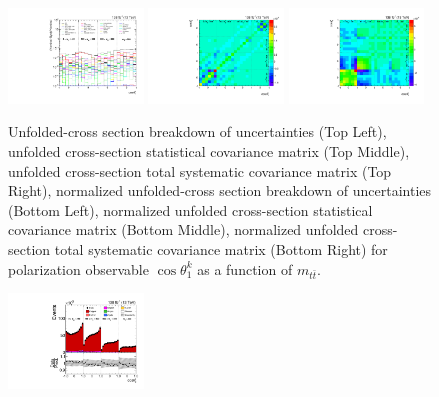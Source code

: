 \begin{refsection}
\begin{figure}[htb]
\begin{center}
 \includegraphics[width=0.32\textwidth]{fig_fullRun2UL/unfolding/combined/deltaSystCombinedlogNorm_rebinnedB_b1k_mttbar.pdf}
 \includegraphics[width=0.32\textwidth]{fig_fullRun2UL/unfolding/combined/StatCovMatrixNorm_rebinnedB_b1k_mttbar.pdf}
 \includegraphics[width=0.32\textwidth]{fig_fullRun2UL/unfolding/combined/TotalSystCovMatrixNorm_rebinnedB_b1k_mttbar.pdf} \\
\caption{Unfolded-cross section breakdown of uncertainties (Top Left), unfolded cross-section statistical covariance matrix (Top Middle), unfolded cross-section total systematic covariance matrix (Top Right), normalized unfolded-cross section breakdown of uncertainties (Bottom Left), normalized unfolded cross-section statistical covariance matrix (Bottom Middle), normalized unfolded cross-section total systematic covariance matrix (Bottom Right) for polarization observable $\cos\theta_{1}^{k}$ as a function of $m_{t\bar{t}}$.}
\label{fig:b1k_mttbar_uncertainties}
\end{center}
\end{figure}
\clearpage
\begin{figure}[htb]
\begin{center}
 \includegraphics[width=0.32\textwidth]{fig_fullRun2UL/controlplots/combined/Hyp_LeptonBk_vs_TTBarMass.pdf}

\end{center}
\end{figure}
\end{refsection}
